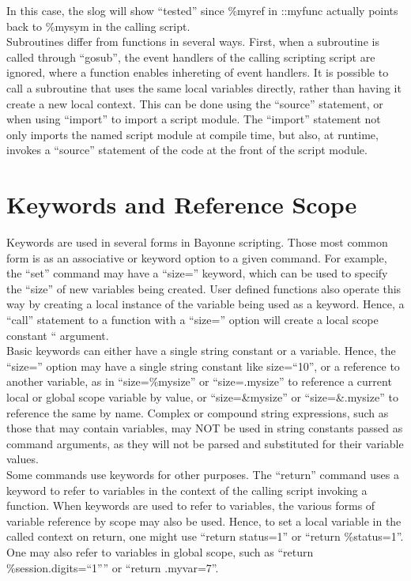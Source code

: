 \documentclass[a4paper,12pt]{article}
\begin{document}
In this case, the slog will show ``tested'' since \%myref in ::myfunc
actually points back to \%mysym in the calling script. \\

Subroutines differ from functions in several ways.  First, when a
subroutine is called through ``gosub'', the event handlers of the
calling scripting script are ignored, where a function enables
inhereting of event handlers.  It is possible to call a subroutine that
uses the same local variables directly, rather than having it create a
new local context.  This can be done using the ``source'' statement, or
when using ``import'' to import a script module.  The ``import''
statement not only imports the named script module at compile time, but
also, at runtime, invokes a ``source'' statement of the code at the
front of the script module. \\

\section{Keywords and Reference Scope}

Keywords are used in several forms in Bayonne scripting.  Those most 
common form is as an associative or keyword option to a given command.  
For example, the ``set'' command may have a ``size='' keyword, which can 
be used to specify the ``size'' of new variables being created.  User 
defined functions also operate this way by creating a local instance of 
the variable being used as a keyword.  Hence, a ``call'' statement to a 
function with a ``size='' option will create a local scope constant 
``%
argument. \\

Basic keywords can either have a single string constant or a variable. 
Hence, the ``size='' option may have a single string constant like
size=``10'', or a reference to another variable, as in ``size=\%mysize''
or ``size=.mysize'' to reference a current local or global scope
variable by value, or ``size=\&mysize'' or ``size=\&.mysize'' to
reference the same by name.  Complex or compound string expressions,
such as those that may contain variables, may NOT be used in string
constants passed as command arguments, as they will not be parsed and
substituted for their variable values. \\

Some commands use keywords for other purposes.  The ``return'' command 
uses a keyword to refer to variables in the context of the calling 
script invoking a function.  When keywords are used to refer to 
variables, the various forms of variable reference by scope may also be 
used.  Hence, to set a local variable in the called context on return, 
one might use ``return status=1'' or ``return \%status=1''.  One may 
also refer to variables in global scope, such as ``return 
\%session.digits=``1'''' or ``return .myvar=7''. \\
\end{document}
